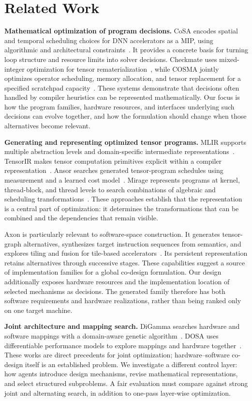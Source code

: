 \section{Related Work}
\textbf{Mathematical optimization of program decisions.}
CoSA encodes spatial and temporal scheduling choices for DNN accelerators as a MIP, using algorithmic and architectural constraints~\cite{cosa}. It provides a concrete basis for turning loop structure and resource limits into solver decisions. Checkmate uses mixed-integer optimization for tensor rematerialization~\cite{checkmate}, while COSMA jointly optimizes operator scheduling, memory allocation, and tensor replacement for a specified scratchpad capacity~\cite{cosma}. These systems demonstrate that decisions often handled by compiler heuristics can be represented mathematically. Our focus is how the program families, hardware resources, and interfaces underlying such decisions can evolve together, and how the formulation should change when those alternatives become relevant.

\textbf{Generating and representing optimized tensor programs.}
MLIR supports multiple abstraction levels and domain-specific intermediate representations~\cite{mlir}. TensorIR makes tensor computation primitives explicit within a compiler representation~\cite{tensorir}. Ansor searches generated tensor-program schedules using measurement and a learned cost model~\cite{ansor}. Mirage represents programs at kernel, thread-block, and thread levels to search combinations of algebraic and scheduling transformations~\cite{mirage}. These approaches establish that the representation is a central part of optimization: it determines the transformations that can be combined and the dependencies that remain visible.

Axon is particularly relevant to software-space construction. It generates tensor-graph alternatives, synthesizes target instruction sequences from semantics, and explores tiling and fusion for tile-based accelerators~\cite{axon}. Its persistent representation retains alternatives through successive stages. These capabilities suggest a source of implementation families for a global co-design formulation. Our design additionally exposes hardware resources and the implementation location of selected mechanisms as decisions. The generated family therefore has both software requirements and hardware realizations, rather than being ranked only on one target machine.

\textbf{Joint architecture and mapping search.}
DiGamma searches hardware and software mappings with a domain-aware genetic algorithm~\cite{digamma}. DOSA uses differentiable performance models to explore mappings and hardware together~\cite{dosa}. These works are direct precedents for joint optimization; hardware--software co-design itself is an established problem. We investigate a different control layer: how agents introduce design mechanisms, revise mathematical representations, and select structured subproblems. A fair evaluation must compare against strong joint and alternating search, in addition to one-pass layer-wise optimization.

